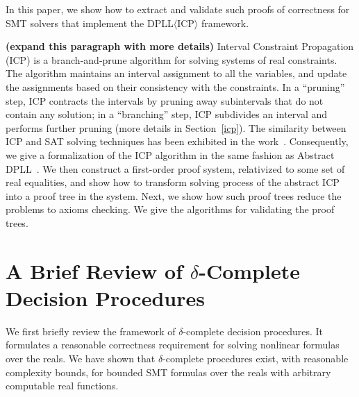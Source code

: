\documentclass[envcountsect]{llncs}
\begin{document}
In this paper, we show how to extract and validate such proofs
of correctness for SMT solvers that implement the DPLL$\langle$ICP$\rangle$
framework.

{\bf (expand this paragraph with more details)}
Interval Constraint Propagation (ICP) is a branch-and-prune algorithm for
solving systems of real constraints. The algorithm maintains an interval
assignment to all the variables, and update the  assignments based on their
consistency with the constraints. In a ``pruning''
step, ICP contracts the intervals by pruning away subintervals that do not
contain any solution; in a ``branching'' step, ICP subdivides an interval and
performs further pruning (more details in Section~\ref{icp}). The similarity
between ICP and SAT solving techniques has been exhibited in the work~\cite{}.
Consequently, we give a formalization of the ICP algorithm in the same fashion
as Abstract DPLL~\cite{}. We then construct a first-order proof system,
relativized to some set of real equalities, and show how to transform solving
process of the abstract ICP into a proof tree in the system. Next, we show how
such proof trees reduce the problems to axioms checking. We give the algorithms
for validating the proof trees.

\newpage

\section{A Brief Review of $\delta$-Complete Decision Procedures}\label{review}

We first briefly review the framework of $\delta$-complete decision procedures.
It formulates a reasonable correctness requirement for solving nonlinear
formulas over the reals. We have shown that $\delta$-complete procedures exist,
with reasonable complexity bounds, for bounded SMT formulas over the reals with
arbitrary computable real functions.
\end{document}
